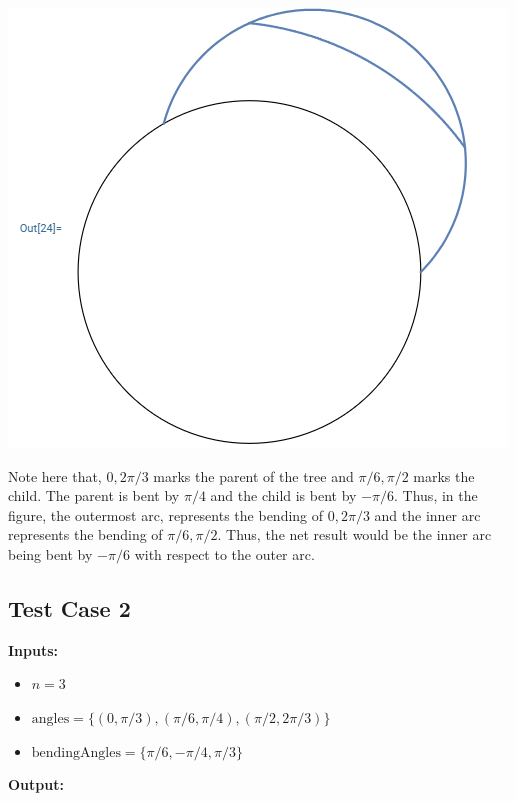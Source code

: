 \documentclass[a4paper,12pt]{article}
\begin{document}
{\centering
\includegraphics[height = 0.4\textheight]{Test 1.png}\\
}\par

Note here that, ${0, 2\pi/3}$ marks the parent of the tree and ${\pi/6, \pi/2}$ marks the child. The parent is bent by $\pi/4$ and the child is bent by $-\pi/6$.
Thus, in the figure, the outermost arc, represents the bending of ${0, 2\pi/3}$ and the inner arc represents the bending of ${\pi/6, \pi/2}$. Thus, the net result would
be the inner arc being bent by $-\pi/6$ with respect to the outer arc.


\subsection*{Test Case 2}
\textbf{Inputs:}
\begin{itemize}
    \item \( n = 3 \)
    \item \( \text{angles} = \{(0, \pi/3), (\pi/6, \pi/4), (\pi/2, 2\pi/3)\} \)
    \item \( \text{bendingAngles} = \{\pi/6, -\pi/4, \pi/3\} \)

\end{itemize}
\textbf{Output:}\\
\end{document}

